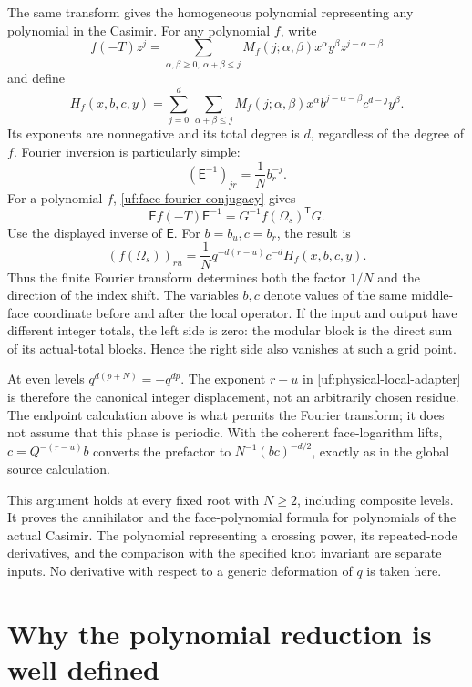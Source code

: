 The same transform gives the homogeneous polynomial representing
any polynomial in the Casimir.
For any polynomial \(f\), write
\[
 f(-T)z^j=\sum_{\alpha,\beta\ge0,\ \alpha+\beta\le j}
  M_f(j;\alpha,\beta)x^\alpha y^\beta z^{j-\alpha-\beta}
\]
and define
\begin{equation}\label{uf:homogeneous-local-adapter}
 H_f(x,b,c,y)=\sum_{j=0}^{d}\,
 \sum_{\alpha+\beta\le j}
 M_f(j;\alpha,\beta)
 x^\alpha b^{j-\alpha-\beta}c^{d-j}y^\beta.
\end{equation}
Its exponents are nonnegative and its total degree is \(d\),
regardless of the degree of \(f\). Fourier inversion is particularly
simple:
\[
 (\mathsf E^{-1})_{jr}=\frac1N b_r^{-j}.
\]
For a polynomial \(f\), \eqref{uf:face-fourier-conjugacy} gives
\[
 \mathsf E f(-T)\mathsf E^{-1}
                  =G^{-1}f(\Omega_s)^{\mathsf T}G.
\]
Use the displayed inverse of \(\mathsf E\). For \(b=b_u,c=b_r\),
the result is
\begin{equation}\label{uf:physical-local-adapter}
 (f(\Omega_s))_{ru}
   =\frac1N q^{-d(r-u)}c^{-d}H_f(x,b,c,y).
\end{equation}
Thus the finite Fourier transform determines both the factor $1/N$
and the direction of the index shift. The variables $b,c$ denote
values of the same middle-face coordinate before and after the local
operator.
If the input and output have different integer totals, the left
side is zero: the modular block is the direct sum of its actual-total
blocks. Hence the right side also vanishes at such a grid point.

At even levels \(q^{d(p+N)}=-q^{dp}\). The exponent \(r-u\)
in \eqref{uf:physical-local-adapter} is therefore the canonical
integer displacement, not an arbitrarily chosen residue. The
endpoint calculation above is what permits the Fourier transform;
it does not assume that this phase is periodic. With the coherent
face-logarithm lifts, \(c=Q^{-(r-u)}b\) converts the prefactor to
\(N^{-1}(bc)^{-d/2}\), exactly as in the global source calculation.

This argument holds at every fixed root with \(N\ge2\), including
composite levels. It proves the annihilator and the face-polynomial formula for
polynomials of the actual Casimir. The polynomial representing a
crossing power, its repeated-node derivatives, and the comparison
with the specified knot invariant are separate inputs. No derivative
with respect to a generic deformation of \(q\) is taken here.

\section{Why the polynomial reduction is well defined}
\label{uf:sec-canonical-reduction}

